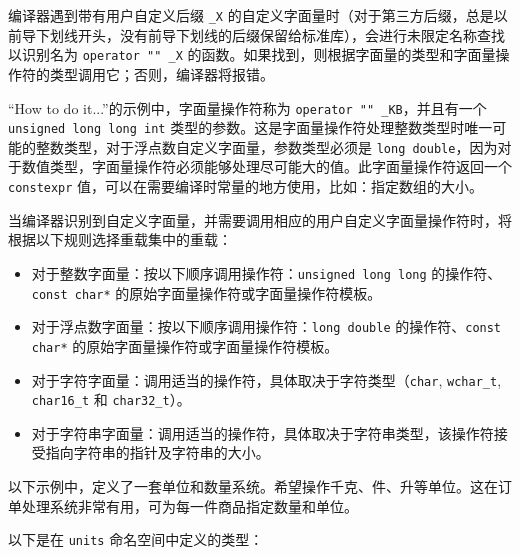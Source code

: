 
编译器遇到带有用户自定义后缀 \verb|_X| 的自定义字面量时（对于第三方后缀，总是以前导下划线开头，没有前导下划线的后缀保留给标准库），会进行未限定名称查找以识别名为 \verb|operator "" _X| 的函数。如果找到，则根据字面量的类型和字面量操作符的类型调用它；否则，编译器将报错。

“How to do it...”的示例中，字面量操作符称为 \verb|operator "" _KB|，并且有一个 \verb|unsigned long long int| 类型的参数。这是字面量操作符处理整数类型时唯一可能的整数类型，对于浮点数自定义字面量，参数类型必须是 \verb|long double|，因为对于数值类型，字面量操作符必须能够处理尽可能大的值。此字面量操作符返回一个 \verb|constexpr| 值，可以在需要编译时常量的地方使用，比如：指定数组的大小。

当编译器识别到自定义字面量，并需要调用相应的用户自定义字面量操作符时，将根据以下规则选择重载集中的重载：

\begin{itemize}
\item
对于整数字面量：按以下顺序调用操作符：\verb|unsigned long long| 的操作符、\verb|const char*| 的原始字面量操作符或字面量操作符模板。

\item
对于浮点数字面量：按以下顺序调用操作符：\verb|long double| 的操作符、\verb|const char*| 的原始字面量操作符或字面量操作符模板。

\item
对于字符字面量：调用适当的操作符，具体取决于字符类型（\verb|char|, \verb|wchar_t|, \verb|char16_t| 和 \verb|char32_t|）。

\item
对于字符串字面量：调用适当的操作符，具体取决于字符串类型，该操作符接受指向字符串的指针及字符串的大小。
\end{itemize}

以下示例中，定义了一套单位和数量系统。希望操作千克、件、升等单位。这在订单处理系统非常有用，可为每一件商品指定数量和单位。

以下是在 \verb|units| 命名空间中定义的类型：

